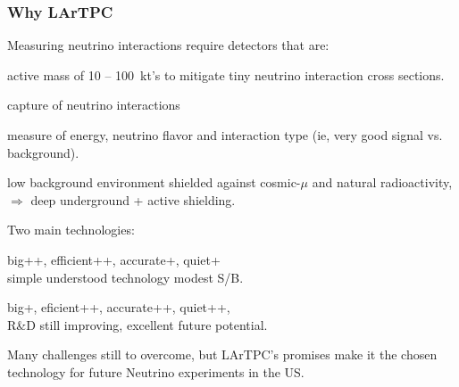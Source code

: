 \documentclass[xcolor=dvipsnames]{beamer}
\begin{document}
\begin{frame}
  \frametitle{Why LArTPC}
  Measuring neutrino interactions require detectors that are:
  \begin{description}\footnotesize
  \item[big] active mass of \num{10} -- \SI{100}{\kilo\tonne}'s to
    mitigate tiny neutrino interaction cross sections.
  \item[efficient] capture of neutrino interactions
  \item[accurate] measure of energy, neutrino flavor and interaction type (ie, very good signal
    vs. background).
  \item[quiet] low background environment shielded against
    cosmic-$\mu$ and natural radioactivity, $\Rightarrow$ deep
    underground + active shielding.
  \end{description}

  Two main technologies:
  \begin{description}\footnotesize
  \item[Water Cherenkov] big++, efficient++, accurate+, quiet+\\
    simple understood technology modest S/B.
  \item[LArTPC] big+, eficient++, accurate++, quiet++, \\
    R\&D still improving, excellent future potential.
  \end{description}

  Many challenges still to overcome, but LArTPC's promises make it the
  chosen technology for future Neutrino experiments in the US.
\end{frame}
\end{document}
